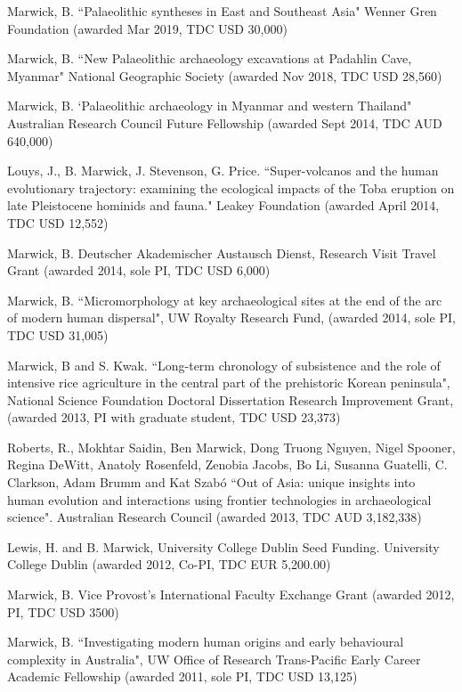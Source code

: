 \medskip

\ind  Marwick, B. ``Palaeolithic syntheses in East and Southeast Asia" Wenner Gren Foundation (awarded Mar 2019, TDC USD 30,000)

\ind  Marwick, B. ``New Palaeolithic archaeology excavations at Padahlin Cave, Myanmar" National Geographic Society (awarded Nov 2018, TDC USD 28,560)

\ind  Marwick, B. `Palaeolithic archaeology in Myanmar and western Thailand" Australian Research Council Future Fellowship (awarded Sept 2014, TDC AUD 640,000)

\ind  Louys, J., B. Marwick, J. Stevenson, G. Price. ``Super-volcanos and the human evolutionary trajectory: examining the ecological impacts of the Toba eruption on late Pleistocene hominids and fauna." Leakey Foundation (awarded April 2014, TDC USD 12,552)

\ind  Marwick, B. Deutscher Akademischer Austausch Dienst, Research Visit Travel Grant (awarded 2014, sole PI, TDC USD 6,000)

\ind  Marwick, B. ``Micromorphology at key archaeological sites at the end of the arc of modern human dispersal", UW Royalty Research Fund, (awarded 2014, sole PI, TDC USD 31,005)

\ind  Marwick, B and S. Kwak. ``Long-term chronology of subsistence and the role of intensive rice agriculture in the central part of the prehistoric Korean peninsula", National Science Foundation Doctoral Dissertation Research Improvement Grant, (awarded 2013,  PI with graduate student, TDC USD 23,373)

\ind  Roberts, R., Mokhtar Saidin, Ben Marwick, Dong Truong Nguyen, Nigel Spooner, Regina DeWitt, Anatoly Rosenfeld, Zenobia Jacobs, Bo Li, Susanna Guatelli, C. Clarkson, Adam Brumm and Kat Szabó ``Out of Asia: unique insights into human evolution and interactions using frontier technologies in archaeological science".  Australian Research Council (awarded 2013, TDC AUD 3,182,338)

\ind Lewis, H. and B. Marwick,  University College Dublin Seed Funding. University College Dublin (awarded 2012, Co-PI, TDC EUR 5,200.00) 

\ind Marwick, B. Vice Provost’s International Faculty Exchange Grant (awarded 2012, PI, TDC USD 3500)

\ind  Marwick, B. ``Investigating modern human origins and early behavioural complexity in Australia", UW Office of Research Trans-Pacific Early Career Academic Fellowship (awarded 2011, sole PI, TDC USD 13,125)

